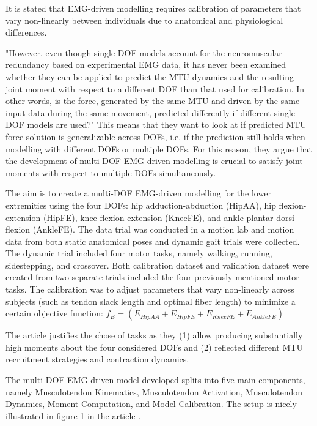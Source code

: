 It is stated that EMG-driven modelling requires calibration of parameters that vary non-linearly between individuals due to anatomical and physiological differences.

"However, even though single-DOF models account for
the neuromuscular redundancy based on experimental EMG data,
it has never been examined whether they can be applied to predict
the MTU dynamics and the resulting joint moment with respect to
a different DOF than that used for calibration. In other words, is
the force, generated by the same MTU and driven by the same
input data during the same movement, predicted differently if
different single-DOF models are used?" \cite[p. 2]{Sartori2012a}
This means that they want to look at if predicted MTU force solution is generalizable across DOFs, i.e. if the prediction still holds when modelling with different DOFs or multiple DOFs. For this reason, they argue that the development of multi-DOF EMG-driven modelling is crucial to satisfy joint moments with respect to multiple DOFs simultaneously. 

The aim is to create a multi-DOF EMG-driven modelling for the lower extremities using the four DOFs: hip adduction-abduction (HipAA), hip flexion-extension (HipFE), knee flexion-extension (KneeFE), and ankle plantar-dorsi flexion (AnkleFE).
The data trial was conducted in a motion lab and motion data from both static anatomical poses and dynamic gait trials were collected. The dynamic trial included four motor tasks, namely walking, running, sidestepping, and crossover. Both calibration dataset and validation dataset were created from two separate trials included the four previously mentioned motor tasks. The calibration was to adjust parameters that vary non-linearly across subjects (such as tendon slack length and optimal fiber length) to minimize a certain objective function: $f_E = \left( E_{HipAA} + E_{HipFE} + E_{KneeFE} + E_{AnkleFE} \right)$

The article justifies the chose of tasks as they (1) allow producing substantially high moments about the four considered DOFs and (2) reflected different MTU recruitment strategies and contraction dynamics.

The multi-DOF EMG-driven model developed splits into five main components, namely Musculotendon Kinematics, Musculotendon Activation, Musculotendon Dynamics, Moment Computation, and Model Calibration. The setup is nicely illustrated in figure 1 in the article \cite[Fig. 1]{Sartori2012a}.

